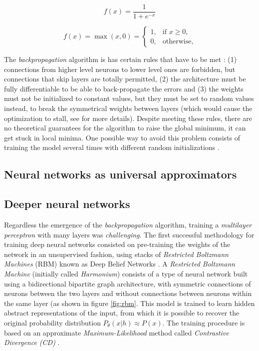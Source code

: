 \begin{equation}
\label{eq:sigmoid}
f(x) = \frac{1}{1+e^{-x}}
\end{equation}

\begin{equation}
\label{eq:relu}
f(x) = \max(x, 0) =
\begin{cases}
1,          & \text{if } x \geq 0 ,\\
0,         & \text{otherwise},
\end{cases}
\end{equation}

The \textit{backpropagation} algorithm is has certain rules that have to be met \cite{hinton1986}: (1) connections from higher level neurons to lower level ones are forbidden, but connections that skip layers are totally permitted, (2) the architecture must be fully differentiable to be able to back-propagate the errors and (3) the weights must not be initialized to constant values, but they must be set to random values instead, to break the symmetrical weights between layers (which would cause the optimization to stall, see \cite{hinton1986} for more details). Despite meeting these rules, there are no theoretical guarantees for the algorithm to raise the global minimum, it can get stuck in local minima. One possible way to avoid this problem consists of training the model several times with different random initializations \cite{haykin1998}.

\subsection{Neural networks as universal approximators}


\subsection{Deeper neural networks}
Regardless the emergence of the \textit{backpropagation} algorithm, training a \textit{multilayer perceptron} with many layers was \textit{challenging}. The first successful methodology for training deep neural networks consisted on pre-training the weights of the network in an unsupervised fashion, using stacks of \textit{Restricted Boltzmann Machines} (RBM) \cite{Smolensky1986} known as Deep Belief Networks \cite{hinton2006, Bengio2007}. A \textit{Restricted Boltzmann Machine} (initially called \textit{Harmonium}) consists of a type of neural network built using a bidirectional bipartite graph architecture, with symmetric connections of neurons between the two layers and without connections between neurons within the same layer (as shown in figure \ref{fig:rbm}. This model is trained to learn hidden abstract representations of the input, from which it is possible to recover the original probability distribution $P_\theta(x|h) \approx P(x)$. The training procedure is based on an approximate \textit{Maximum-Likelihood} method called \textit{Contrastive Divergence (CD)} \cite{hinton2002}.

